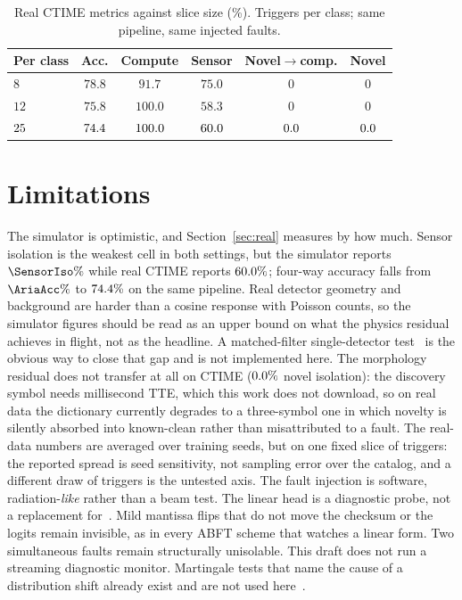 \documentclass{ieeeaccess}
\begin{document}
\begin{table}[!t]
\caption{Real CTIME metrics against slice size (\%). Triggers per class; same pipeline, same injected faults.}
\label{tab:realtrend}
\centering
\begin{tabular}{lccccc}
\toprule
Per class & Acc. & Compute & Sensor & Novel$\to$comp. & Novel \\
\midrule
$8$  & $78.8$ & $91.7$ & $75.0$ & $0$ & $0$ \\
$12$ & $75.8$ & $100.0$ & $58.3$ & $0$ & $0$ \\
$25$ & $74.4$ & $100.0$ & $60.0$ & $0.0$ & $0.0$ \\
\bottomrule
\end{tabular}
\end{table}

\section{Limitations}

The simulator is optimistic, and Section~\ref{sec:real} measures by how much. Sensor isolation is the weakest cell in both settings, but the simulator reports $\SensorIso\%$ while real CTIME reports $60.0\%$; four-way accuracy falls from $\AriaAcc\%$ to $74.4\%$ on the same pipeline. Real detector geometry and background are harder than a cosine response with Poisson counts, so the simulator figures should be read as an upper bound on what the physics residual achieves in flight, not as the headline. A matched-filter single-detector test~\cite{perera2025} is the obvious way to close that gap and is not implemented here. The morphology residual does not transfer at all on CTIME ($0.0\%$ novel isolation): the discovery symbol needs millisecond TTE, which this work does not download, so on real data the dictionary currently degrades to a three-symbol one in which novelty is silently absorbed into known-clean rather than misattributed to a fault. The real-data numbers are averaged over \RealSeeds{} training seeds, but on one fixed slice of \RealCubes{} triggers: the reported spread is seed sensitivity, not sampling error over the catalog, and a different draw of triggers is the untested axis. The fault injection is software, radiation-\emph{like} rather than a beam test. The linear head is a diagnostic probe, not a replacement for~\cite{john2025}. Mild mantissa flips that do not move the checksum or the logits remain invisible, as in every ABFT scheme that watches a linear form. Two simultaneous faults remain structurally unisolable. This draft does not run a streaming diagnostic monitor. Martingale tests that name the cause of a distribution shift already exist and are not used here~\cite{hindy2025}.
\end{document}

